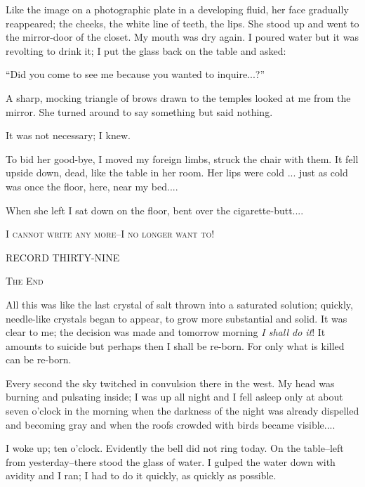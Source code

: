 \documentclass[11pt,openany]{book}
\begin{document}
Like the image on a photographic plate in a developing fluid, her face gradually reappeared; the cheeks, the white line of teeth, the lips. She stood up and went to the mirror-door of the closet. My mouth was dry again. I poured water but it was revolting to drink it; I put the glass back on the table and asked:

``Did you come to see me because you wanted to inquire...?''

A sharp, mocking triangle of brows drawn to the temples looked at me from the mirror. She turned around to say something but said nothing.

It was not necessary; I knew.

To bid her good-bye, I moved my foreign limbs, struck the chair with them. It fell upside down, dead, like the table in her room. Her lips were cold ... just as cold was once the floor, here, near my bed....

When she left I sat down on the floor, bent over the cigarette-butt....

\begin{center}\textsc{I cannot write any more--I no longer want to!}\end{center}

\begin{center}\textsc{RECORD THIRTY-NINE}\end{center}

\begin{center}\textsc{The End}\end{center}

All this was like the last crystal of salt thrown into a saturated solution; quickly, needle-like crystals began to appear, to grow more substantial and solid. It was clear to me; the decision was made and tomorrow morning \emph{I shall do it}! It amounts to suicide but perhaps then I shall be re-born. For only what is killed can be re-born.

Every second the sky twitched in convulsion there in the west. My head was burning and pulsating inside; I was up all night and I fell asleep only at about seven o'clock in the morning when the darkness of the night was already dispelled and becoming gray and when the roofs crowded with birds became visible....

I woke up; ten o'clock. Evidently the bell did not ring today. On the table--left from yesterday--there stood the glass of water. I gulped the water down with avidity and I ran; I had to do it quickly, as quickly as possible.
\end{document}
